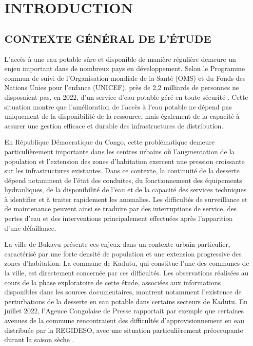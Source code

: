 \chapter*{INTRODUCTION}\label{introduction}

\section{CONTEXTE GÉNÉRAL DE L'ÉTUDE}
\label{contexte-general-de-letude}

L'accès à une eau potable sûre et disponible de manière régulière demeure
un enjeu important dans de nombreux pays en développement. Selon le
Programme commun de suivi de l'Organisation mondiale de la Santé (OMS)
et du Fonds des Nations Unies pour l'enfance (UNICEF), près de
2,2 milliards de personnes ne disposaient pas, en 2022, d'un service
d'eau potable géré en toute sécurité \cite{ref1}. Cette situation montre
que l'amélioration de l'accès à l'eau potable ne dépend pas uniquement
de la disponibilité de la ressource, mais également de la capacité à
assurer une gestion efficace et durable des infrastructures de
distribution.

En République Démocratique du Congo, cette problématique demeure
particulièrement importante dans les centres urbains où l'augmentation
de la population et l'extension des zones d'habitation exercent une
pression croissante sur les infrastructures existantes. Dans ce
contexte, la continuité de la desserte dépend notamment de l'état des
conduites, du fonctionnement des équipements hydrauliques, de la
disponibilité de l'eau et de la capacité des services techniques à
identifier et à traiter rapidement les anomalies. Les difficultés de
surveillance et de maintenance peuvent ainsi se traduire par des
interruptions de service, des pertes d'eau et des interventions
principalement effectuées après l'apparition d'une défaillance.

La ville de Bukavu présente ces enjeux dans un contexte urbain
particulier, caractérisé par une forte densité de population et une
extension progressive des zones d'habitation. La commune de Kadutu,
qui constitue l'une des communes de la ville, est directement concernée
par ces difficultés. Les observations réalisées au cours de la phase
exploratoire de cette étude, associées aux informations disponibles
dans les sources documentaires, montrent notamment l'existence de
perturbations de la desserte en eau potable dans certains secteurs de
Kadutu. En juillet 2022, l'Agence Congolaise de Presse rapportait par
exemple que certaines avenues de la commune rencontraient des
difficultés d'approvisionnement en eau distribuée par la REGIDESO,
avec une situation particulièrement préoccupante durant la saison
sèche \cite{ref127}.

